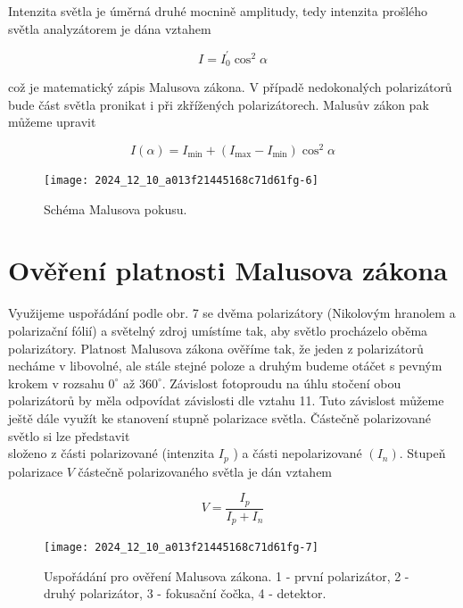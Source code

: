 \documentclass[czech,11pt,a4paper]{article}
\begin{document}
\begin{multicols}{2}
	
	Intenzita světla je úměrná druhé mocnině amplitudy, tedy intenzita prošlého světla analyzátorem je dána vztahem
	
	\begin{equation}
		I=I_{0}^{\prime} \cos ^{2} \alpha
	\end{equation}
	
	
	což je matematický zápis Malusova zákona. V případě nedokonalých polarizátorů bude část světla pronikat i při zkřížených polarizátorech. Malusův zákon pak můžeme upravit
	
	\begin{equation}
		I(\alpha)=I_{\min }+\left(I_{\max }-I_{\min }\right) \cos ^{2} \alpha
	\end{equation}
	
	
	\begin{figure}[H]
		\texttt{[image: 2024\_12\_10\_a013f21445168c71d61fg-6]}
		\caption{Schéma Malusova pokusu.}
	\end{figure}
	
	
	
	\section*{Ověření platnosti Malusova zákona}
	Využijeme uspořádání podle obr. 7 se dvěma polarizátory (Nikolovým hranolem a polarizační fólií) a světelný zdroj umístíme tak, aby světlo procházelo oběma polarizátory. Platnost Malusova zákona ověříme tak, že jeden z polarizátorů necháme v libovolné, ale stále stejné poloze a druhým budeme otáčet s pevným krokem v rozsahu $0^{\circ}$ až $360^{\circ}$. Závislost fotoproudu na úhlu stočení obou polarizátorů by měla odpovídat závislosti dle vztahu 11. Tuto závislost můžeme ještě dále využít ke stanovení stupně polarizace světla. Částečně polarizované světlo si lze představit\\
	složeno z části polarizované (intenzita $I_{p}$ ) a části nepolarizované $\left(I_{n}\right)$. Stupeň polarizace $V$ částečně polarizovaného světla je dán vztahem
	
	
	\begin{equation}
		V=\frac{I_{p}}{I_{p}+I_{n}}
	\end{equation}
	
	
	\begin{figure}[H]
		\texttt{[image: 2024\_12\_10\_a013f21445168c71d61fg-7]}
		\caption{Uspořádání pro ověření Malusova zákona. 1 - první polarizátor, 2 - druhý polarizátor, 3 - fokusační čočka, 4 - detektor.}
	\end{figure}
	

\end{multicols}
\end{document}
